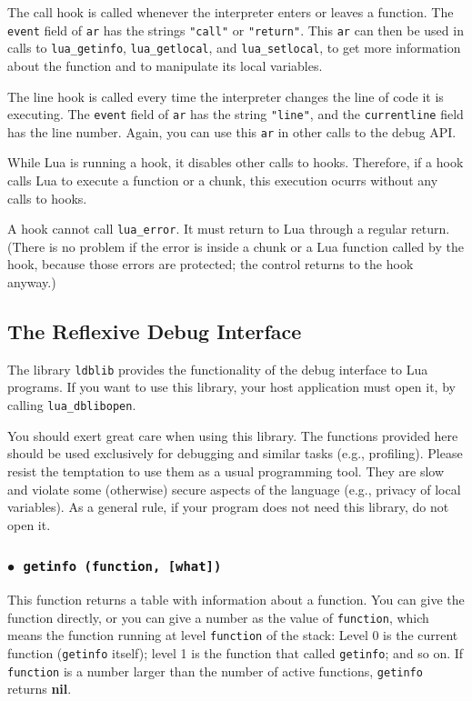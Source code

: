 \documentclass[11pt]{article}
\newcommand{\T}[1]{{\tt #1}}
\newcommand{\nil}{{\bf nil}}
\newcommand{\Deffunc}[1]{\index{#1}}
\newcommand{\ff}{$\bullet$\ }
\begin{document}
The call hook is called whenever the
interpreter enters or leaves a function.
The \verb|event| field of \verb|ar| has the strings \verb|"call"|
or \verb|"return"|.
This \verb|ar| can then be used in calls to \verb|lua_getinfo|,
\verb|lua_getlocal|, and \verb|lua_setlocal|,
to get more information about the function and to manipulate its
local variables.

The line hook is called every time the interpreter changes
the line of code it is executing.
The \verb|event| field of \verb|ar| has the string \verb|"line"|,
and the \verb|currentline| field has the line number.
Again, you can use this \verb|ar| in other calls to the debug API.

While Lua is running a hook, it disables other calls to hooks.
Therefore, if a hook calls Lua to execute a function or a chunk,
this execution ocurrs without any calls to hooks.

A hook cannot call \T{lua_error}.
It must return to Lua through a regular return.
(There is no problem if the error is inside a chunk or a Lua function
called by the hook, because those errors are protected;
the control returns to the hook anyway.)


\subsection{The Reflexive Debug Interface}

The library \verb|ldblib| provides
the functionality of the debug interface to Lua programs.
If you want to use this library,
your host application must open it,
by calling \verb|lua_dblibopen|.

You should exert great care when using this library.
The functions provided here should be used exclusively for debugging
and similar tasks (e.g., profiling).
Please resist the temptation to use them as a
usual programming tool.
They are slow and violate some (otherwise) secure aspects of the
language (e.g., privacy of local variables).
As a general rule, if your program does not need this library,
do not open it.


\subsubsection*{\ff \T{getinfo (function, [what])}}\Deffunc{getinfo}

This function returns a table with information about a function.
You can give the function directly,
or you can give a number as the value of \verb|function|,
which means the function running at level \verb|function| of the stack:
Level 0 is the current function (\verb|getinfo| itself);
level 1 is the function that called \verb|getinfo|;
and so on.
If \verb|function| is a number larger than the number of active functions,
\verb|getinfo| returns \nil.
\end{document}
